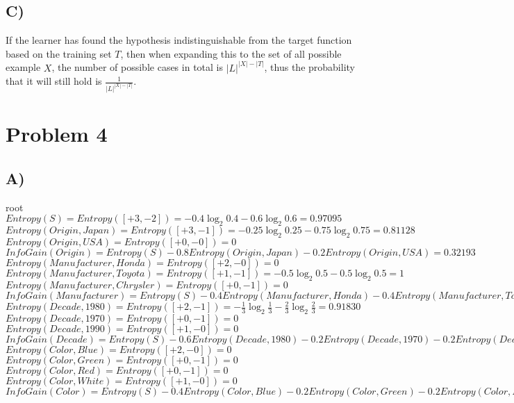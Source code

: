 \documentclass[11pt]{article}
\begin{document}
\subsection*{C)}
If the learner has found the hypothesis indistinguishable from the target function based on the training set $T$, then when expanding this to the set of all possible example $X$, the number of possible cases in total is $|L|^{|X|-|T|}$, thus the probability that it will still hold is $\frac{1}{|L|^{|X|-|T|}}$.

\section*{Problem 4}

\subsection*{A)}
root\\
$Entropy(S)=Entropy([+3,-2])=-0.4\log_2 0.4-0.6\log_2 0.6=0.97095$\\

\noindent $Entropy(Origin, Japan)=Entropy([+3,-1])=-0.25\log_2 0.25-0.75\log_2 0.75=0.81128$\\
$Entropy(Origin, USA)=Entropy([+0,-0])=0$\\
$InfoGain(Origin)=Entropy(S)-0.8Entropy(Origin, Japan)-0.2Entropy(Origin, USA)=0.32193$\\

\noindent $Entropy(Manufacturer, Honda)=Entropy([+2,-0])=0$\\
$Entropy(Manufacturer, Toyota)=Entropy([+1,-1])=-0.5\log_2 0.5-0.5\log_2 0.5=1$\\
$Entropy(Manufacturer, Chrysler)=Entropy([+0,-1])=0$\\
$InfoGain(Manufacturer)=Entropy(S)-0.4Entropy(Manufacturer, Honda)-0.4Entropy(Manufacturer, Toyota)-0.2Entropy(Manufacturer, Chrysler)=0.57075$\\

\noindent $Entropy(Decade, 1980)=Entropy([+2,-1])=-\frac{1}{3}\log_2 \frac{1}{3}-\frac{2}{3}\log_2 \frac{2}{3}=0.91830$\\
$Entropy(Decade, 1970)=Entropy([+0,-1])=0$\\
$Entropy(Decade, 1990)=Entropy([+1,-0])=0$\\
$InfoGain(Decade)=Entropy(S)-0.6Entropy(Decade, 1980)-0.2Entropy(Decade, 1970)-0.2Entropy(Decade, 1990)=0.41997$\\

\noindent $Entropy(Color, Blue)=Entropy([+2,-0])=0$\\
$Entropy(Color, Green)=Entropy([+0,-1])=0$\\
$Entropy(Color, Red)=Entropy([+0,-1])=0$\\
$Entropy(Color, White)=Entropy([+1,-0])=0$\\
$InfoGain(Color)=Entropy(S)-0.4Entropy(Color, Blue)-0.2Entropy(Color, Green)-0.2Entropy(Color, Blue)-0.2Entropy(Color, While)=0.97075$\\
\end{document}
